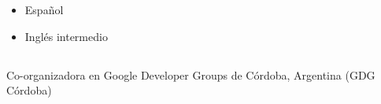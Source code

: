 \documentclass[%
               doublesided,
               paper=a4,
               fontsize=10pt
              ]{my-resume}
\begin{document}
{ 
\begin{itemize}
\item 	Español
\item 	Inglés intermedio
\end{itemize}
 
\vspace{1.0em}
\subsection{  }
 
\begin{itemize}
    
    {Co-organizadora en Google Developer Groups de Córdoba, Argentina (GDG Córdoba)}
\end{itemize}

}
\end{document}
